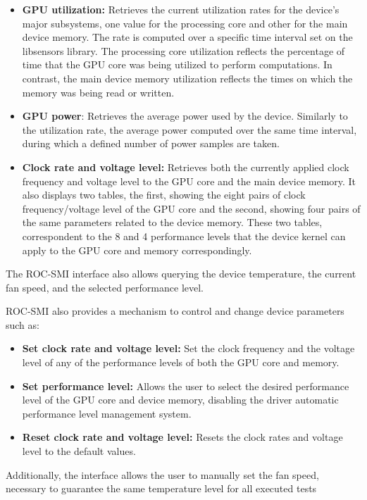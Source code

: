 \begin{itemize}
\item \textbf{GPU utilization:} Retrieves the current utilization rates for the device's major subsystems, one value for the processing core and other for the main device memory. The rate is computed over a specific time interval set on the libsensors library. The processing core utilization reflects the percentage of time that the GPU core was being utilized to perform computations. In contrast, the main device memory utilization reflects the times on which the memory was being read or written.

\item \textbf{GPU power}: Retrieves the average power used by the device. Similarly to the utilization rate, the average power computed over the same time interval, during which a defined number of power samples are taken.

\item \textbf{Clock rate and voltage level:} Retrieves both the currently applied clock frequency and voltage level to the GPU core and the main device memory. It also displays two tables, the first, showing the eight pairs of clock frequency/voltage level of the GPU core and the second, showing four pairs of the same parameters related to the device memory. These two tables, correspondent to the 8 and 4 performance levels that the device kernel can apply to the GPU core and memory correspondingly.
\end{itemize}

The ROC-SMI interface also allows querying the device temperature, the current fan speed, and the selected performance level.

ROC-SMI also provides a mechanism to control and change device parameters such as:
\begin{itemize}
\item \textbf{Set clock rate and voltage level:} Set the clock frequency and the voltage level of any of the performance levels of both the GPU core and memory. 
\item \textbf{Set performance level:} Allows the user to select the desired performance level of the GPU core and device memory, disabling the driver automatic performance level management system.
\item \textbf{Reset clock rate and voltage level:} Resets the clock rates and voltage level to the default values.
\end{itemize}

Additionally, the interface allows the user to manually set the fan speed, necessary to guarantee the same temperature level for all executed tests

